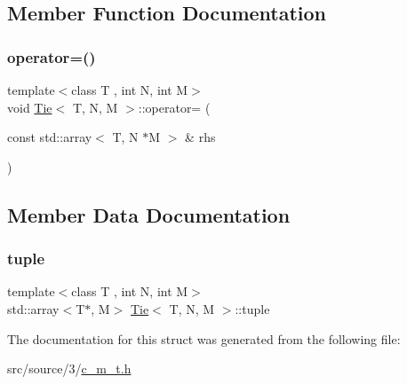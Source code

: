 \subsection{Member Function Documentation}
\mbox{\label{structTie_af835eefa6c2e6208589721587d8f743d}} 
\subsubsection{\texorpdfstring{operator=()}{operator=()}}
{\footnotesize\ttfamily template$<$class T , int N, int M$>$ \\
void \hyperlink{structTie}{Tie}$<$ T, N, M $>$\+::operator= (\begin{DoxyParamCaption}\item[{const std\+::array$<$ T, N $\ast$M $>$ \&}]{rhs }\end{DoxyParamCaption})\hspace{0.3cm}{\ttfamily [inline]}}



\subsection{Member Data Documentation}
\mbox{\label{structTie_a787e11998c210d1f1019ad3aee9adf82}} 
\subsubsection{\texorpdfstring{tuple}{tuple}}
{\footnotesize\ttfamily template$<$class T , int N, int M$>$ \\
std\+::array$<$T$\ast$, M$>$ \hyperlink{structTie}{Tie}$<$ T, N, M $>$\+::tuple}



The documentation for this struct was generated from the following file\+:\begin{DoxyCompactItemize}
\item 
src/source/3/\hyperlink{c__m__t_8h}{c\+\_\+m\+\_\+t.\+h}\end{DoxyCompactItemize}
